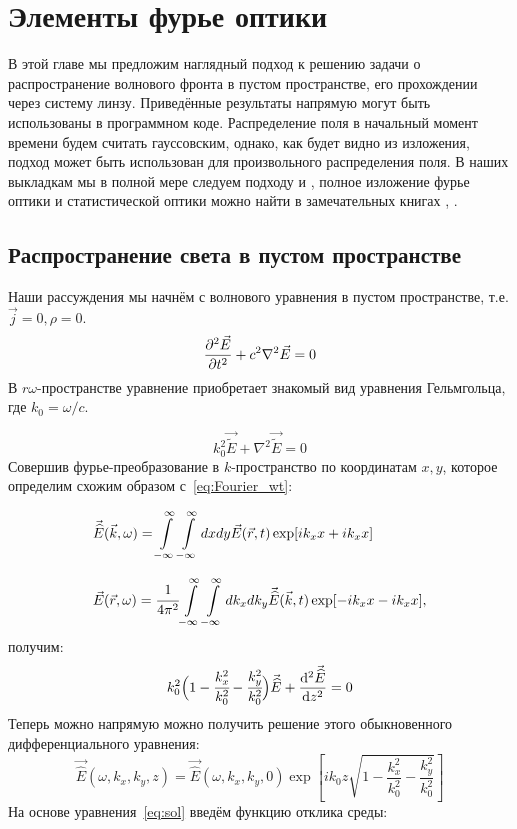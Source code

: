 \chapter{Элементы фурье оптики}
В этой главе мы предложим наглядный подход к решению задачи о распространение волнового фронта в пустом пространстве, его прохождении через систему линзу. Приведённые результаты напрямую могут быть использованы в программном коде. Распределение поля в начальный момент времени будем считать гауссовским, однако, как будет видно из изложения, подход может быть использован для произвольного распределения поля. В наших выкладкам мы в полной мере следуем подходу \cite{serkez2013grating} и \cite{serkez2015design}, полное изложение фурье оптики и статистической оптики можно найти в замечательных книгах \cite{goodman2015statistical}, \cite{goodman2005introduction}.

\section{Распространение света в пустом пространстве}
Наши рассуждения мы начнём с волнового уравнения в пустом пространстве, т.е. $\vec{j} = 0, \rho = 0$. 
\begin{equation}
	\pdv[2]{\vec{E}}{t} + c^2 \nabla^2 \vec{E} = 0
\end{equation}
В  $r\omega$-пространстве уравнение приобретает знакомый вид уравнения Гельмгольца, где $k_0 = \omega/c$.

\begin{equation}
	k_0^2\vec{\widetilde{E}} + \nabla^2 \vec{\widetilde{E}} = 0
\end{equation}
Совершив фурье-преобразование в $k$-пространство по координатам $x,y$, которое определим схожим образом с~\ref{eq:Fourier_wt}:

\begin{equation}
	\label{eq:Fourier_rk}
	\begin{array}{lcl}
		\vec{\widehat{E}}(\vec{k}, \omega) = \displaystyle\int\limits_{-\infty}^{\infty}\int\limits_{-\infty}^{\infty} dxdy \vec{E}(\vec{r}, t)\exp[ik_xx + ik_xx]\\
		\\
		\vec{E}(\vec{r}, \omega) = \cfrac{1}{4\pi^2}\displaystyle\int\limits_{-\infty}^{\infty}\int\limits_{-\infty}^{\infty} dk_xdk_y \vec{\widehat{E}}(\vec{k}, t)\exp[-ik_xx - ik_xx],
	\end{array}
\end{equation}
получим: 
\begin{equation}
	k_0^2\Big(1 - \cfrac{k^2_x}{k^2_0} - \cfrac{k^2_y}{k^2_0} \Big)\vec{\widehat{E}} + \dv[2]{\vec{\widehat{E}}}{z} = 0
\end{equation}
Теперь можно напрямую можно получить решение этого обыкновенного дифференциального уравнения:
\begin{equation}
	\label{eq:sol}
	\vec{\widehat{E}}(\omega, k_x, k_y, z) = \vec{\widehat{E}}(\omega, k_x, k_y, 0)\exp[ik_0z\sqrt{1 - \frac{k^2_x}{k^2_0} - \frac{k^2_y}{k^2_0}} ]
\end{equation}
На основе уравнения~\ref{eq:sol} введём функцию отклика среды:

